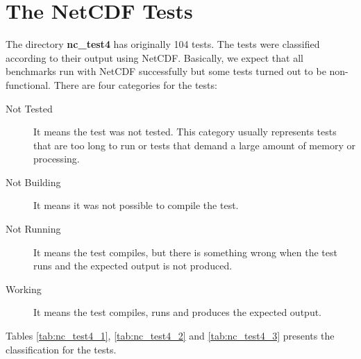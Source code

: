 \chapter{The NetCDF Tests}
\label{ch:nctests}

\tab
The directory \textbf{nc\_test4} has originally 104 tests. The tests were classified according to their output using NetCDF. Basically, we expect that all benchmarks run with NetCDF successfully but some tests turned out to be non-functional.
There are four categories for the tests:

\begin{description}

\item[Not Tested] It means the test was not tested. This category usually represents tests that are too long to run or tests that demand a large amount of memory or processing.

\item[Not Building] It means it was not possible to compile the test.

\item[Not Running] It means the test compiles, but there is something wrong when the test runs and the expected output is not produced.

\item[Working] It means the test compiles, runs and produces the expected output.

\end{description}

Tables \ref{tab:nc_test4_1}, \ref{tab:nc_test4_2} and \ref{tab:nc_test4_3} presents the classification for the tests.
